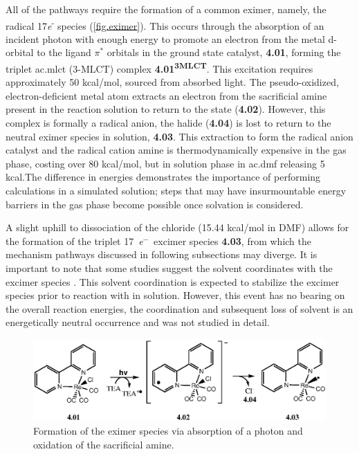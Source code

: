 All of the pathways require the formation of a common eximer, namely, the radical 17\textit{e}\textsuperscript{-} species (\autoref{fig.eximer}). This occurs through the absorption of an incident photon with enough energy to promote an electron from the metal d-orbital to the ligand $\pi^\ast$ orbitals in the ground state catalyst, \textbf{4.01}, forming the triplet \acrlong{ac.mlct} (3-MLCT) complex \textbf{4.01\textsuperscript{3MLCT}}. This excitation requires approximately 50 kcal/mol, sourced from absorbed light. The pseudo-oxidized, electron-deficient metal atom extracts an electron from the sacrificial amine present in the reaction solution to return to the  state (\textbf{4.02}). However, this complex is formally a radical anion, the halide (\textbf{4.04}) is lost to return to the neutral eximer species in solution, \textbf{4.03}. This extraction to form the radical anion catalyst and the radical cation amine is thermodynamically expensive in the gas phase, costing over 80 kcal/mol, but in solution phase in \gls{ac.dmf} releasing 5 kcal.The difference in energies demonstrates the importance of performing calculations in a simulated solution; steps that may have insurmountable energy barriers in the gas phase become possible once solvation is considered.

A slight uphill to dissociation of the chloride (15.44 kcal/mol in DMF) allows for the formation of the triplet 17~\textit{e}$^-$~excimer species \textbf{4.03}, from which the  mechanism pathways discussed in following subsections may diverge. It is important to note that some studies suggest the solvent coordinates with the excimer species \autocite{morris2009, kou2014}. This solvent coordination is expected to stabilize the excimer species prior to reaction with  in solution\autocite{fujita2004}. However, this event has no bearing on the overall reaction energies, the coordination and subsequent loss of solvent is an energetically neutral occurrence and was not studied in detail.

\begin{figure}[!htb]
 \begin{center}
  \includegraphics[clip=true, width=120mm, keepaspectratio]{images/eximer.eps}
 \end{center}
\caption{Formation of the eximer species via absorption of a photon and oxidation of the sacrificial amine.}
\label{fig.eximer}
\end{figure} 

